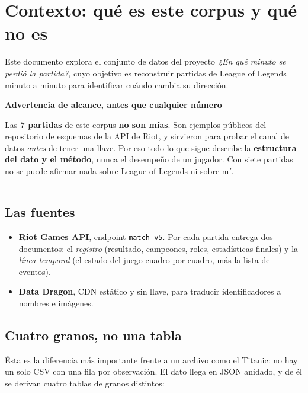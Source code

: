 \documentclass[11pt,letterpaper]{article}
\newenvironment{respuesta}[1]
  {\par\medskip\setlength{\fboxsep}{10pt}%
   \begin{lrbox}{\cajaresp}%
   \begin{minipage}{\dimexpr\linewidth-2\fboxsep-3pt\relax}%
   \color{tinta}\textcolor{azul}{\textbf{#1}}\par\smallskip\ignorespaces}
  {\end{minipage}%
   \end{lrbox}%
   \noindent\textcolor{azul}{\rule[-\dp\cajaresp]{3pt}{\dimexpr\ht\cajaresp+\dp\cajaresp\relax}}%
   \colorbox{papel}{\usebox{\cajaresp}}\par\medskip}
\newcommand{\dato}[1]{\textbf{\textcolor{azul}{#1}}}
\begin{document}
\tableofcontents
\newpage

\section{Contexto: qué es este corpus y qué no es}

Este documento explora el conjunto de datos del proyecto \emph{¿En qué minuto se
perdió la partida?}, cuyo objetivo es reconstruir partidas de League of Legends
minuto a minuto para identificar cuándo cambia su dirección.

\begin{respuesta}{Advertencia de alcance, antes que cualquier número}
Las \dato{7 partidas} de este corpus \textbf{no son mías}. Son ejemplos públicos
del repositorio de esquemas de la API de Riot, y sirvieron para probar el canal de
datos \emph{antes} de tener una llave. Por eso todo lo que sigue describe la
\textbf{estructura del dato y el método}, nunca el desempeño de un jugador.
Con siete partidas no se puede afirmar nada sobre League of Legends ni sobre mí.
\end{respuesta}

\subsection{Las fuentes}
\begin{itemize}[leftmargin=1.4em,itemsep=.25em]
  \item \textbf{Riot Games API}, endpoint \texttt{match-v5}. Por cada partida
        entrega dos documentos: el \emph{registro} (resultado, campeones, roles,
        estadísticas finales) y la \emph{línea temporal} (el estado del juego
        cuadro por cuadro, más la lista de eventos).
  \item \textbf{Data Dragon}, CDN estático y sin llave, para traducir
        identificadores a nombres e imágenes.
\end{itemize}

\subsection{Cuatro granos, no una tabla}
Ésta es la diferencia más importante frente a un archivo como el Titanic: no hay
un solo CSV con una fila por observación. El dato llega en JSON anidado, y de él
se derivan cuatro tablas de granos distintos:
\end{document}
